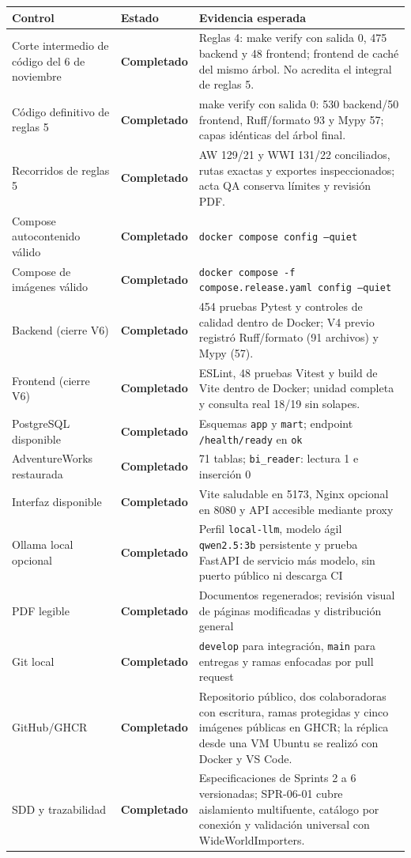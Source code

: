 \documentclass[11pt,letterpaper]{article}
\newcommand{\statusok}{\textcolor{deepgreen}{\textbf{Completado}}}
\newcommand{\file}[1]{\texttt{#1}}
\begin{document}
\begin{tabularx}{\textwidth}{@{}p{}@{\hspace{0.18in}}p{}@{\hspace{0.18in}}X@{}}
  \toprule
  \textbf{Control} & \textbf{Estado} & \textbf{Evidencia esperada} \\
  \midrule
  Corte intermedio de código del 6 de noviembre & \statusok & Reglas 4: make verify con salida 0, 475 backend y 48 frontend; frontend de caché del mismo árbol. No acredita el integral de reglas 5. \\
  Código definitivo de reglas 5 & \statusok & make verify con salida 0: 530 backend/50 frontend, Ruff/formato 93 y Mypy 57; capas idénticas del árbol final. \\
  Recorridos de reglas 5 & \statusok & AW 129/21 y WWI 131/22 conciliados, rutas exactas y exportes inspeccionados; acta QA conserva límites y revisión PDF. \\
  Compose autocontenido válido & \statusok & \file{docker compose config --quiet} \\
  Compose de imágenes válido & \statusok & \file{docker compose -f compose.release.yaml config --quiet} \\
  Backend (cierre V6) & \statusok & 454 pruebas Pytest y controles de calidad dentro de Docker; V4 previo registró Ruff/formato (91 archivos) y Mypy (57). \\
  Frontend (cierre V6) & \statusok & ESLint, 48 pruebas Vitest y build de Vite dentro de Docker; unidad completa y consulta real 18/19 sin solapes. \\
  PostgreSQL disponible & \statusok & Esquemas \file{app} y \file{mart}; endpoint \file{/health/ready} en \file{ok} \\
  AdventureWorks restaurada & \statusok & 71 tablas; \file{bi\_reader}: lectura 1 e inserción 0 \\
  Interfaz disponible & \statusok & Vite saludable en 5173, Nginx opcional en 8080 y API accesible mediante proxy \\
  Ollama local opcional & \statusok & Perfil \file{local-llm}, modelo ágil \file{qwen2.5:3b} persistente y prueba FastAPI de servicio más modelo, sin puerto público ni descarga CI \\
  PDF legible & \statusok & Documentos regenerados; revisión visual de páginas modificadas y distribución general \\
  Git local & \statusok & \file{develop} para integración, \file{main} para entregas y ramas enfocadas por pull request \\
  GitHub/GHCR & \statusok & Repositorio público, dos colaboradoras con escritura, ramas protegidas y cinco imágenes públicas en GHCR; la réplica desde una VM Ubuntu se realizó con Docker y VS Code. \\
  SDD y trazabilidad & \statusok & Especificaciones de Sprints 2 a 6 versionadas; SPR-06-01 cubre aislamiento multifuente, catálogo por conexión y validación universal con WideWorldImporters. \\
  \bottomrule
\end{tabularx}
\end{document}
